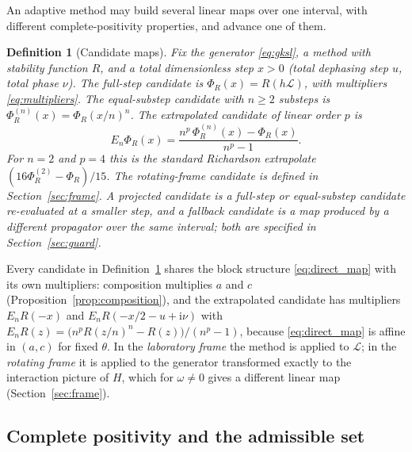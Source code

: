 \documentclass[pdflatex,sn-mathphys-num]{sn-jnl}
\newcommand{\ii}{\mathrm{i}}
\newcommand{\Lgen}{\mathcal L}
\theoremstyle{thmstyleone}
\theoremstyle{thmstylethree}
\newtheorem{definition}{Definition}
\theoremstyle{thmstyletwo}
\begin{document}
An adaptive method may build several linear maps over one interval, with different complete-positivity properties, and advance one of them.

\begin{definition}[Candidate maps]\label{def:candidate}
Fix the generator \eqref{eq:gksl}, a method with stability function $R$, and a total dimensionless step $x>0$ (total dephasing step $u$, total phase $\nu$). The \emph{full-step candidate} is $\Phi_R(x)=R(h\Lgen)$, with multipliers \eqref{eq:multipliers}. The \emph{equal-substep candidate} with $n\ge2$ substeps is $\Phi_R^{(n)}(x)=\Phi_R(x/n)^n$. The \emph{extrapolated candidate} of linear order $p$ is
\begin{equation}
 E_n\Phi_R(x)=\frac{n^p\,\Phi_R^{(n)}(x)-\Phi_R(x)}{n^p-1}.
 \label{eq:extrapolated_candidate}
\end{equation}
For $n=2$ and $p=4$ this is the standard Richardson extrapolate $(16\Phi_R^{(2)}-\Phi_R)/15$. The \emph{rotating-frame candidate} is defined in Section~\ref{sec:frame}. A \emph{projected candidate} is a full-step or equal-substep candidate re-evaluated at a smaller step, and a \emph{fallback candidate} is a map produced by a different propagator over the same interval; both are specified in Section~\ref{sec:guard}.
\end{definition}

Every candidate in Definition~\ref{def:candidate} shares the block structure \eqref{eq:direct_map} with its own multipliers: composition multiplies $a$ and $c$ (Proposition~\ref{prop:composition}), and the extrapolated candidate has multipliers $E_n R(-x)$ and $E_nR(-x/2-u+\ii\nu)$ with $E_nR(z)={\big(n^pR(z/n)^n-R(z)\big)/(n^p-1)}$, because \eqref{eq:direct_map} is affine in $(a,c)$ for fixed $\theta$. In the \emph{laboratory frame} the method is applied to $\Lgen$; in the \emph{rotating frame} it is applied to the generator transformed exactly to the interaction picture of $H$, which for $\omega\ne0$ gives a different linear map (Section~\ref{sec:frame}).

\subsection{Complete positivity and the admissible set}\label{sec:cp_def}
\end{document}
